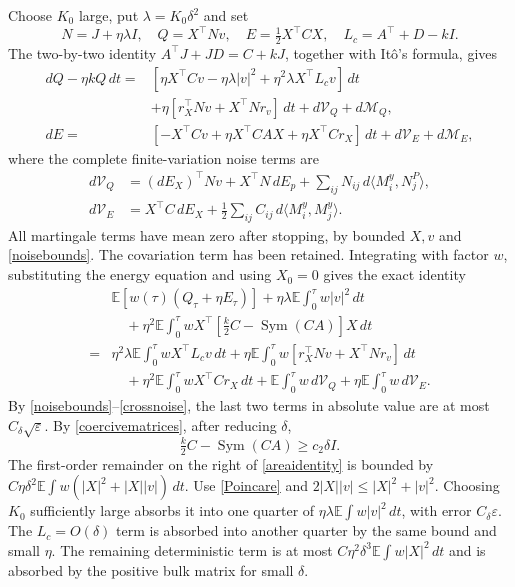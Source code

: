 \documentclass[11pt,a4paper]{article}
\newcommand{\E}{\mathbb E}
\newcommand{\Sym}{\operatorname{Sym}}
\newcommand{\dt}{\,dt}
\begin{document}
Choose $K_0$ large, put $\lambda=K_0\delta^2$ and set
\[
 N=J+\eta\lambda I,\quad Q=X^\top Nv,\quad
 E=\tfrac12X^\top CX,\quad L_c=A^\top+D-kI.
\]
The two-by-two identity $A^\top J+JD=C+kJ$, together with It\^o's
formula, gives
\[
 \begin{split}
 dQ-\eta kQ\dt={}&[\eta X^\top Cv-\eta\lambda|v|^2
                   +\eta^2\lambda X^\top L_cv]\dt\\
 &+\eta[r_X^\top Nv+X^\top Nr_v]\dt+d\mathcal V_Q+d\mathcal M_Q,\\
 dE={}&[-X^\top Cv+\eta X^\top CAX+\eta X^\top Cr_X]\dt
                           +d\mathcal V_E+d\mathcal M_E,
 \end{split}
\]
where the complete finite-variation noise terms are
\[
 \begin{split}
 d\mathcal V_Q&=(dE_X)^\top Nv+X^\top N\,dE_p
                  +\sum_{ij}N_{ij}\,d\langle M_i^y,N_j^P\rangle,\\
 d\mathcal V_E&=X^\top C\,dE_X
                  +\tfrac12\sum_{ij}C_{ij}\,d\langle M_i^y,M_j^y\rangle.
 \end{split}
\]
All martingale terms have mean zero after stopping, by bounded
$X,v$ and \eqref{noisebounds}. The covariation term has been retained.
Integrating with factor $w$, substituting the energy equation and using
$X_0=0$ gives the exact identity
\begin{equation}\label{areaidentity}
 \begin{split}
 &\E[w(\tau)(Q_\tau+\eta E_\tau)]
     +\eta\lambda\E\int_0^\tau w|v|^2\dt\\
 &\quad+\eta^2\E\int_0^\tau
       wX^\top[\tfrac{k}{2}C-\Sym(CA)]X\dt\\
 ={}&\eta^2\lambda\E\int_0^\tau wX^\top L_cv\dt
   +\eta\E\int_0^\tau w[r_X^\top Nv+X^\top Nr_v]\dt\\
 &\quad+\eta^2\E\int_0^\tau wX^\top Cr_X\dt
    +\E\int_0^\tau w\,d\mathcal V_Q
    +\eta\E\int_0^\tau w\,d\mathcal V_E.
 \end{split}
\end{equation}
By \eqref{noisebounds}--\eqref{crossnoise}, the last two terms in
absolute value are at most $C_\delta\sqrt\varepsilon$.
By \eqref{coercivematrices}, after reducing $\delta$,
\[
 \tfrac{k}{2}C-\Sym(CA)\geq c_2\delta I.
\]
The first-order remainder on the right of \eqref{areaidentity} is
bounded by $C\eta\delta^2\E\int w(|X|^2+|X||v|)\dt$.
Use \eqref{Poincare} and $2|X||v|\leq|X|^2+|v|^2$.
Choosing $K_0$ sufficiently large absorbs it into one quarter of
$\eta\lambda\E\int w|v|^2\dt$, with error $C_\delta\varepsilon$.
The $L_c=O(\delta)$ term is absorbed into another quarter by the same
bound and small $\eta$. The remaining deterministic term is at most
$C\eta^2\delta^3\E\int w|X|^2\dt$ and is absorbed by the positive
bulk matrix for small $\delta$.
\end{document}
